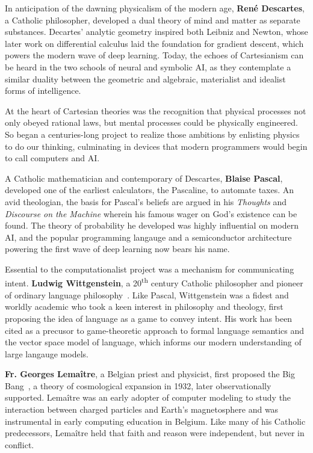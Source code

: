 \documentclass[sigplan,nonacm]{acmart}\settopmatter{printfolios=false,printccs=false,printacmref=false}
\begin{document}
  In anticipation of the dawning physicalism of the modern age, \textbf{Ren\'e Descartes}, a Catholic philosopher, developed a dual theory of mind and matter as separate substances. Decartes' analytic geometry inspired both Leibniz and Newton, whose later work on differential calculus laid the foundation for gradient descent, which powers the modern wave of deep learning. Today, the echoes of Cartesianism can be heard in the two schools of neural and symbolic AI, as they contemplate a similar duality between the geometric and algebraic, materialist and idealist forms of intelligence.

  At the heart of Cartesian theories was the recognition that physical processes not only obeyed rational laws, but mental processes could be physically engineered. So began a centuries-long project to realize those ambitions by enlisting physics to do our thinking, culminating in devices that modern programmers would begin to call computers and AI.

  A Catholic mathematician and contemporary of Descartes, \textbf{Blaise Pascal}, developed one of the earliest calculators, the Pascaline, to automate taxes. An avid theologian, the basis for Pascal's beliefs are argued in his \textit{Thoughts} and \textit{Discourse on the Machine} wherein his famous wager on God's existence can be found. The theory of probability he developed was highly influential on modern AI, and the popular programming langauge and a semiconductor architecture powering the first wave of deep learning now bears his name.

  Essential to the computationalist project was a mechanism for communicating intent. \textbf{Ludwig Wittgenstein}, a 20\textsuperscript{th} century Catholic philosopher and pioneer of ordinary language philosophy~\cite{wittgenstein1929some}. Like Pascal, Wittgenstein was a fidest and worldly academic who took a keen interest in philosophy and theology, first proposing the idea of language as a game to convey intent. His work has been cited as a precusor to game-theoretic approach to formal language semantics and the vector space model of language, which informs our modern understanding of large langauge models.

  \textbf{Fr. Georges Lema\^itre}, a Belgian priest and physicist, first proposed the Big Bang~\cite{lemaitre1931beginning}, a theory of cosmological expansion in 1932, later observationally supported. Lema\^itre was an early adopter of computer modeling to study the interaction between charged particles and Earth's magnetosphere and was instrumental in early computing education in Belgium. Like many of his Catholic predecessors, Lema\^itre held that faith and reason were independent, but never in conflict.
\end{document}

